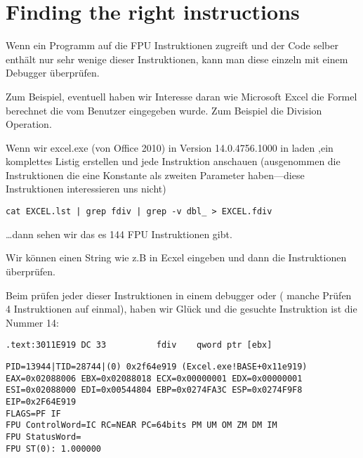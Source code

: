 \section{Finding the right instructions} %

Wenn ein Programm auf die FPU Instruktionen zugreift und der Code selber enthält nur sehr wenige
dieser Instruktionen, kann man diese einzeln mit einem Debugger überprüfen.

\par Zum Beispiel, eventuell haben wir Interesse daran wie Microsoft Excel die Formel berechnet die vom Benutzer eingegeben wurde.
Zum Beispiel die Division Operation.

\myindex{\GrepUsage}

Wenn wir excel.exe (von Office 2010) in Version 14.0.4756.1000 in \IDA laden ,ein komplettes
Listig erstellen und jede \FDIV Instruktion anschauen (ausgenommen die Instruktionen die
eine Konstante als zweiten Parameter haben---diese Instruktionen interessieren uns nicht)

\begin{lstlisting}
cat EXCEL.lst | grep fdiv | grep -v dbl_ > EXCEL.fdiv
\end{lstlisting}

\dots dann sehen wir das es 144 FPU Instruktionen gibt.

\par Wir können einen String wie z.B  in Ecxel eingeben und dann die Instruktionen überprüfen.


\par Beim prüfen jeder dieser Instruktionen in einem debugger oder \tracer
( manche Prüfen 4 Instruktionen auf einmal), haben wir Glück und die
gesuchte Instruktion ist die Nummer 14:

\begin{lstlisting}[style=customasmx86]
.text:3011E919 DC 33          fdiv    qword ptr [ebx]
\end{lstlisting}

\begin{lstlisting}
PID=13944|TID=28744|(0) 0x2f64e919 (Excel.exe!BASE+0x11e919)
EAX=0x02088006 EBX=0x02088018 ECX=0x00000001 EDX=0x00000001
ESI=0x02088000 EDI=0x00544804 EBP=0x0274FA3C ESP=0x0274F9F8
EIP=0x2F64E919
FLAGS=PF IF
FPU ControlWord=IC RC=NEAR PC=64bits PM UM OM ZM DM IM 
FPU StatusWord=
FPU ST(0): 1.000000
\end{lstlisting}

